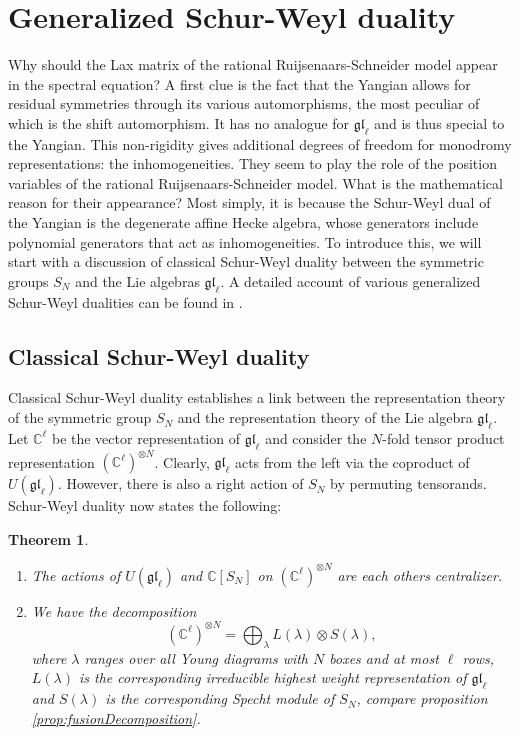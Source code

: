 \documentclass[11pt]{report}
\newtheorem{theorem}{Theorem}[section]
\theoremstyle{definition}
\theoremstyle{remark}
\theoremstyle{remark}
\newcommand{\C}{\mathbb{C}}
\begin{document}
\section{Generalized Schur-Weyl duality}

Why should the Lax matrix of the rational Ruijsenaars-Schneider model appear in the spectral equation? A first clue is the fact that the Yangian allows for residual symmetries through its various automorphisms, the most peculiar of which is the shift automorphism. It has no analogue for $\mathfrak{gl}_\ell$ and is thus special to the Yangian. This non-rigidity gives additional degrees of freedom for monodromy representations: the inhomogeneities. They seem to play the role of the position variables of the rational Ruijsenaars-Schneider model. What is the mathematical reason for their appearance? Most simply, it is because the Schur-Weyl dual of the Yangian is the degenerate affine Hecke algebra, whose generators include polynomial generators that act as inhomogeneities. To introduce this, we will start with a discussion of classical Schur-Weyl duality between the symmetric groups $S_N$ and the Lie algebras $\mathfrak{gl}_\ell$. A detailed account of various generalized Schur-Weyl dualities can be found in \cite{thesis:antor:2020}.

\subsection{Classical Schur-Weyl duality}

Classical Schur-Weyl duality establishes a link between the representation theory of the symmetric group $S_N$ and the representation theory of the Lie algebra $\mathfrak{gl}_\ell$. Let $\C^\ell$ be the vector representation of $\mathfrak{gl}_\ell$ and consider the $N$-fold tensor product representation $(\C^\ell)^{\otimes N}$. Clearly, $\mathfrak{gl}_\ell$ acts from the left via the coproduct of $U(\mathfrak{gl}_\ell)$. However, there is also a right action of $S_N$ by permuting tensorands. Schur-Weyl duality now states the following:

\begin{theorem}
\begin{enumerate}[label=(\roman*)]
\item The actions of $U(\mathfrak{gl}_\ell)$ and $\C[S_N]$ on $(\C^\ell)^{\otimes N}$ are each others centralizer.
\item We have the decomposition
\begin{equation*}
(\C^\ell)^{\otimes N} = \bigoplus_{\lambda} L(\lambda) \otimes S(\lambda),
\end{equation*}
where $\lambda$ ranges over all Young diagrams with $N$ boxes and at most $\ell$ rows, $L(\lambda)$ is the corresponding irreducible highest weight representation of $\mathfrak{gl}_\ell$ and $S(\lambda)$ is the corresponding Specht module of $S_N$, compare proposition \ref{prop:fusionDecomposition}.
\end{enumerate}
\end{theorem}
\end{document}
